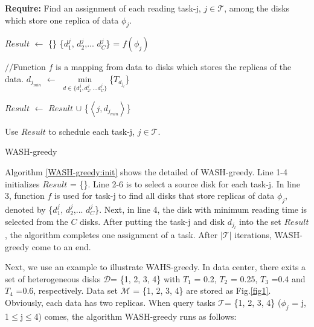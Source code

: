 \documentclass[conference]{IEEEtran}
\begin{document}
\begin{algorithm}

	\textbf{Require:} Find an assignment of each reading task-j, $j \in \mathcal{T}$, among the disks which store one replica of data $\phi_j$.

	\begin{algorithmic}[1]
		
		\State $Result$ $\gets$ \{\}\label{WASH-greedy:init}
			\State \{$d_{1}^j$, $d_{2}^j$,... $d_{C}^j$\} = $f(\phi_j)$
		
		$//$Function $f$ is a mapping from data to disks which stores the replicas of the data.
			\State $d_{j_{min}}$ $\gets$ $\min\limits_{d \in \{d_{1}^j, d_{2}^j,... d_{C}^j\} }$\{$T_{d_{j_l}}$\}
		
			\State $Result$ $\gets$ $Result$ $\cup$
			\{$\left \langle j, d_{j_{min}}\right \rangle$\}
		\EndFor
	
	\State Use $Result$ to schedule each task-j, $j \in \mathcal{T}$.
	\end{algorithmic}
	\caption{WASH-greedy}\label{WASH-greedy}
\end{algorithm}

Algorithm \ref{WASH-greedy:init} shows the detailed of WASH-greedy. Line 1-4 initializes $Result$ = \{\}. Line 2-6 is to select a source disk for each task-j. In line 3, function $f$ is used for task-j to find all disks that store replicas of data $\phi_j$, denoted by \{$d_{1}^j$, $d_{2}^j$,... $d_{C}^j$\}. Next, in line 4, the disk with minimum reading time is selected from the $C$ disks. After putting the task-j and disk $d_{j_l}$ into the set $Result$, the algorithm completes one assignment of a task. After $\mathcal{|T|}$ iterations, WASH-greedy come to an end.


Next, we use an example to illustrate WAHS-greedy. In data center, there exits a set of heterogeneous disks $\mathcal{D}$= \{1, 2, 3, 4\} with $T_1$ = 0.2,  $T_2$ = 0.25,  $T_3$ =0.4 and $T_4$ =0.6, respectively. Data set $\mathcal{M}$ = \{1, 2, 3, 4\} are stored as Fig.\ref{fig1}. Obviously, each data has two replicas. When query tasks $\mathcal{T}$= \{1, 2, 3, 4\} ($\phi_j$ = j, 1$\leq$j$ \leq$4) comes, the algorithm WASH-greedy runs as follows: %
\end{document}
